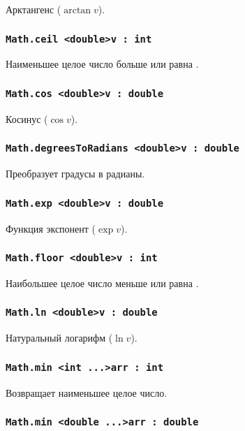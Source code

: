 Арктангенс ($\arctan{v}$).

\subsubsection{\lstinline|Math.ceil <double>v : int|}

Наименьшее целое число больше или равна .

\subsubsection{\lstinline|Math.cos <double>v : double|}

Косинус ($\cos{v}$).

\subsubsection{\lstinline|Math.degreesToRadians <double>v : double|}

Преобразует градусы в радианы.

\subsubsection{\lstinline|Math.exp <double>v : double|}

Функция экспонент ($\exp{v}$).

\subsubsection{\lstinline|Math.floor <double>v : int|}

Наибольшее целое число меньше или равна .

\subsubsection{\lstinline|Math.ln <double>v : double|}

Натуральный логарифм ($\ln{v}$).

\subsubsection{\lstinline|Math.min <int ...>arr : int|}

Возвращает наименьшее целое число.

\subsubsection{\lstinline|Math.min <double ...>arr : double|}

